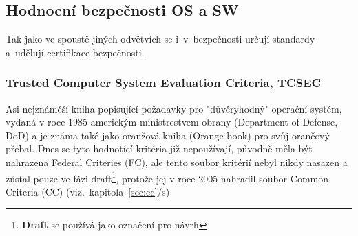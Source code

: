 \documentclass[a4paper,12pt]{article}
\newcommand{\odkazNaKapitolu}[1]{(viz.~kapitola~\ref{#1}/s\pageref{#1})}
\renewcommand{\b}[1]{\textbf{#1}} %
\begin{document}

\subsection{Hodnocní bezpečnosti OS a SW}
Tak jako ve spoustě jiných odvětvích se i~v~bezpečnosti určují standardy a~udělují certifikace bezpečnosti.
\subsubsection{Trusted Computer System Evaluation Criteria, TCSEC} \label{sec:TCSEC}
Asi nejznáměší kniha popisující požadavky pro "důvěryhodný" operační systém, vydaná v roce 1985 americkým ministrestvem obrany (Department of Defense, DoD) a je známa také jako oranžová kniha (Orange book) pro svůj orančový přebal. Dnes se tyto hodnotící kritéria již nepoužívají, původně měla být nahrazena Federal Criteries (FC), ale tento soubor kritérií nebyl nikdy nasazen a zůstal pouze ve fázi draft\footnote{\b{Draft} se používá jako označení pro návrh}, protože jej v roce 2005 nahradil soubor Common Criteria (CC) \odkazNaKapitolu{sec:cc}\\
\end{document}
